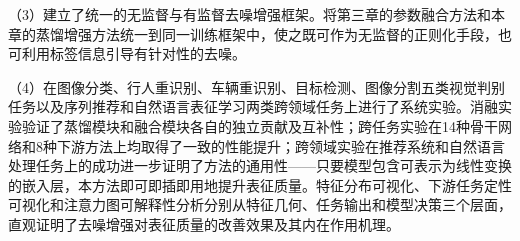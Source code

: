（3）建立了统一的无监督与有监督去噪增强框架。将第三章的参数融合方法和本章的蒸馏增强方法统一到同一训练框架中，使之既可作为无监督的正则化手段，也可利用标签信息引导有针对性的去噪。

（4）在图像分类、行人重识别、车辆重识别、目标检测、图像分割五类视觉判别任务以及序列推荐和自然语言表征学习两类跨领域任务上进行了系统实验。消融实验验证了蒸馏模块和融合模块各自的独立贡献及互补性；跨任务实验在14种骨干网络和8种下游方法上均取得了一致的性能提升；跨领域实验在推荐系统和自然语言处理任务上的成功进一步证明了方法的通用性——只要模型包含可表示为线性变换的嵌入层，本方法即可即插即用地提升表征质量。特征分布可视化、下游任务定性可视化和注意力图可解释性分析分别从特征几何、任务输出和模型决策三个层面，直观证明了去噪增强对表征质量的改善效果及其内在作用机理。